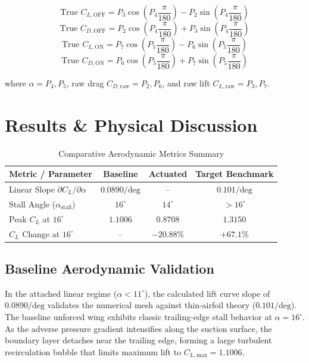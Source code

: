 \documentclass[conference]{IEEEtran}
\begin{document}
\begin{equation}
\text{True } C_{L,\text{OFF}} = P_3 \cos\left(P_4 \frac{\pi}{180}\right) - P_2 \sin\left(P_4 \frac{\pi}{180}\right)
\end{equation}
\begin{equation}
\text{True } C_{D,\text{OFF}} = P_2 \cos\left(P_4 \frac{\pi}{180}\right) + P_3 \sin\left(P_4 \frac{\pi}{180}\right)
\end{equation}
\begin{equation}
\text{True } C_{L,\text{ON}} = P_7 \cos\left(P_5 \frac{\pi}{180}\right) - P_6 \sin\left(P_5 \frac{\pi}{180}\right)
\end{equation}
\begin{equation}
\text{True } C_{D,\text{ON}} = P_6 \cos\left(P_5 \frac{\pi}{180}\right) + P_7 \sin\left(P_5 \frac{\pi}{180}\right)
\end{equation}

\noindent where $\alpha = P_4, P_5$, raw drag $C_{D,\text{raw}} = P_2, P_6$, and raw lift $C_{L,\text{raw}} = P_3, P_7$.

\section{Results \& Physical Discussion}

\begin{table}[htbp]
\caption{Comparative Aerodynamic Metrics Summary}
\begin{center}
\begin{tabular}{lccc}
\toprule
\textbf{Metric / Parameter} & \textbf{Baseline} & \textbf{Actuated} & \textbf{Target Benchmark} \\
\midrule
Linear Slope $\partial C_L/\partial \alpha$ & $0.0890/\text{deg}$ & -- & $0.101/\text{deg}$ \\
Stall Angle ($\alpha_{\text{stall}}$) & $16^\circ$ & $14^\circ$ & $> 16^\circ$ \\
Peak $C_L$ at $16^\circ$ & $1.1006$ & $0.8708$ & $1.3150$ \\
$C_L$ Change at $16^\circ$ & -- & $-20.88\%$ & $+67.1\%$ \\
\bottomrule
\end{tabular}
\end{center}
\end{table}

\subsection{Baseline Aerodynamic Validation}
In the attached linear regime ($\alpha < 11^\circ$), the calculated lift curve slope of $0.0890/\text{deg}$ validates the numerical mesh against thin-airfoil theory ($0.101/\text{deg}$). The baseline unforced wing exhibits classic trailing-edge stall behavior at $\alpha = 16^\circ$. As the adverse pressure gradient intensifies along the suction surface, the boundary layer detaches near the trailing edge, forming a large turbulent recirculation bubble that limits maximum lift to $C_{L,\text{max}} = 1.1006$.
\end{document}
